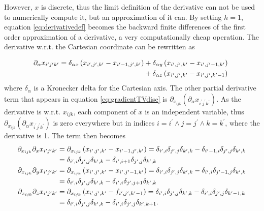 However, $x$ is discrete, thus the limit definition of the derivative can not be used to numerically compute it, but an approximation of it can. By setting $h=1$, equation \ref{eq:derivativedef} becomes the backward finite differences of the first order approximation of a derivative, a very computationally cheap operation. The derivative w.r.t. the Cartesian coordinate can be rewritten as

\begin{align}
\partial_\alpha x_{i^\prime j^\prime k^\prime}=\delta_{\alpha x} \left(x_{i^\prime,j^\prime,k^\prime}-x_{i^\prime-1, j^\prime, k^\prime}\right)&+ \delta_{\alpha y} \left(x_{i^\prime,j^\prime,k^\prime}-x_{i^\prime, j^\prime-1, k^\prime}\right)  \notag \\ &+ \delta_{\alpha z} \left(x_{i^\prime,j^\prime,k^\prime}-x_{i^\prime ,j^\prime, k^\prime-1}\right)\
\end{align}
 where $\delta_\alpha$ is a Kronecker delta for the Cartesian axis. The other partial derivative term that appears in equation \ref{eq:gradientTVdisc} is $\partial_{x_{ijk}} \left(\partial_\alpha x_{i^\prime j^\prime k^\prime}\right)$. As the derivative is w.r.t. $x_{ijk}$, each component of $x$ is an independent variable, thus $\partial_{x_{ijk}} \left(\partial_\alpha x_{i^\prime j^\prime k^\prime}\right)$ is zero everywhere but in indices $i=i^\prime \wedge j=j^\prime \wedge k=k^\prime$, where the derivative is 1. The term then becomes 
 \begin{align}
\partial_{x_{ijk}} \partial_x x_{i^\prime j^\prime k^\prime}&=\partial_{x_{ijk}}\left(x_{i^\prime,j^\prime,k^\prime}-x_{i^\prime-1, j^\prime, k^\prime}\right)=\delta_{i^\prime,i}\delta_{j^\prime,j}\delta_{k^\prime,k} - \delta_{i^\prime-1,i}\delta_{j^\prime,j}\delta_{k^\prime,k}\nonumber\\
&=\delta_{i^\prime,i}\delta_{j^\prime,j}\delta_{k^\prime,k} - \delta_{i^\prime,i+1}\delta_{j^\prime,j}\delta_{k^\prime,k}\nonumber\\
%
\partial_{x_{ijk}} \partial_y x_{i^\prime j^\prime k^\prime}&=\partial_{x_{ijk}} \left(x_{i^\prime,j^\prime,k^\prime}-x_{i^\prime, j^\prime-1, k^\prime}\right)=\delta_{i^\prime,i}\delta_{j^\prime,j}\delta_{k^\prime,k} - \delta_{i^\prime,i}\delta_{j^\prime-1,j}\delta_{k^\prime,k}\notag\\
&=\delta_{i^\prime,i}\delta_{j^\prime,j}\delta_{k^\prime,k} - \delta_{i^\prime,i}\delta_{j^\prime,j+1}\delta_{k^\prime,k}\nonumber\\
%
\partial_{x_{ijk}} \partial_z x_{i^\prime j^\prime k^\prime}&=\partial_{x_{ijk}} \left(x_{i^\prime,j^\prime,k^\prime}-f_{i^\prime, j^\prime, k^\prime-1}\right)=\delta_{i^\prime,i}\delta_{j^\prime,j}\delta_{k^\prime,k} - \delta_{i^\prime,i}\delta_{j^\prime,j}\delta_{k^\prime-1,k}\notag\\
&=\delta_{i^\prime,i}\delta_{j^\prime,j}\delta_{k^\prime,k} - \delta_{i^\prime,i}\delta_{j^\prime,j}\delta_{k^\prime,k+1}.
\end{align}

